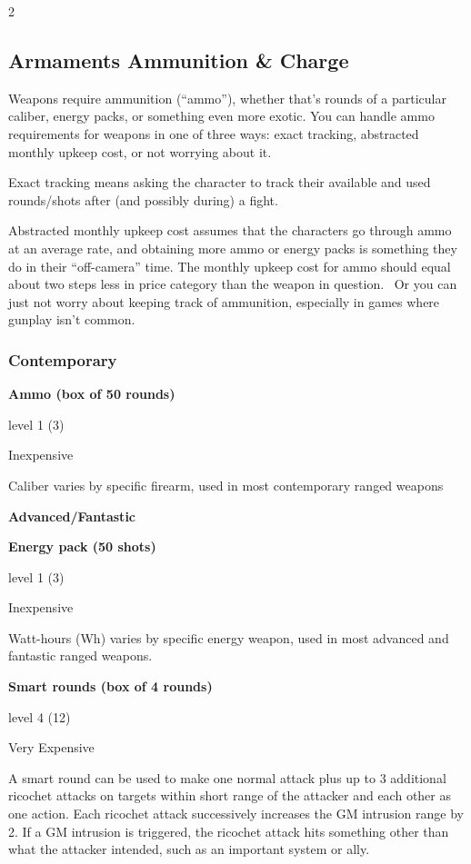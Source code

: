 \begin{multicols}{2}
\subsection{Armaments Ammunition \& Charge}

Weapons require ammunition (“ammo”), whether that’s rounds of a particular caliber, energy packs, or something even more exotic. You can handle ammo requirements for weapons in one of three ways: exact tracking, abstracted monthly upkeep cost, or not worrying about it. 

Exact tracking means asking the character to track their available and used rounds/shots after (and possibly during) a fight. 

Abstracted monthly upkeep cost assumes that the characters go through ammo at an average rate, and obtaining more ammo or energy packs is something they do in their “off-camera” time. The monthly upkeep cost for ammo should equal about two steps less in price category than the weapon in question. 
Or you can just not worry about keeping track of ammunition, especially in games where gunplay isn’t common.

\subsubsection{Contemporary}

\textbf{Ammo (box of 50 rounds)} 

level 1 (3)

Inexpensive 

Caliber varies by specific firearm, used in most contemporary ranged weapons

\textbf{Advanced/Fantastic}

\textbf{Energy pack (50 shots)} 

level 1 (3)

Inexpensive 

Watt-hours (Wh) varies by specific energy weapon, used in most advanced and fantastic ranged weapons. 

\textbf{Smart rounds (box of 4 rounds)} 

level 4 (12) 

Very Expensive 

A smart round can be used to make one normal attack plus up to 3 additional ricochet attacks on targets within short range of the attacker and each other as one action. Each ricochet attack successively increases the GM intrusion range by 2. If a GM intrusion is triggered, the ricochet attack hits something other than what the attacker intended, such as an important system or ally.


\end{multicols}
